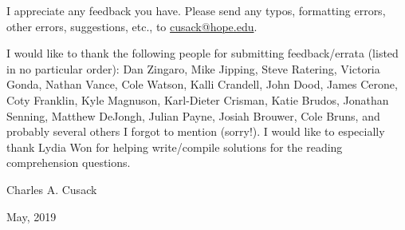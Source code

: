 I appreciate any feedback you have.  
Please send any typos, formatting errors, other errors, suggestions, etc., to  
\href{mailto:cusack@hope.edu}{cusack@hope.edu}.

I would like to thank the following people for submitting feedback/errata (listed in no particular order):
Dan Zingaro, 
Mike Jipping, 
Steve Ratering, 
Victoria Gonda, 
Nathan Vance, 
Cole Watson, 
Kalli Crandell, 
John Dood, 
James Cerone,
Coty Franklin, 
Kyle Magnuson, 
Karl-Dieter Crisman,
Katie Brudos, 
Jonathan Senning, 
Matthew DeJongh, 
Julian Payne, 
Josiah Brouwer,
Cole Bruns,
and probably several others I forgot to mention (sorry!).
I would like to especially thank Lydia Won for helping 
write/compile solutions for the reading comprehension questions.

\bigskip
\noindent
Charles A. Cusack

\noindent
May, 2019

